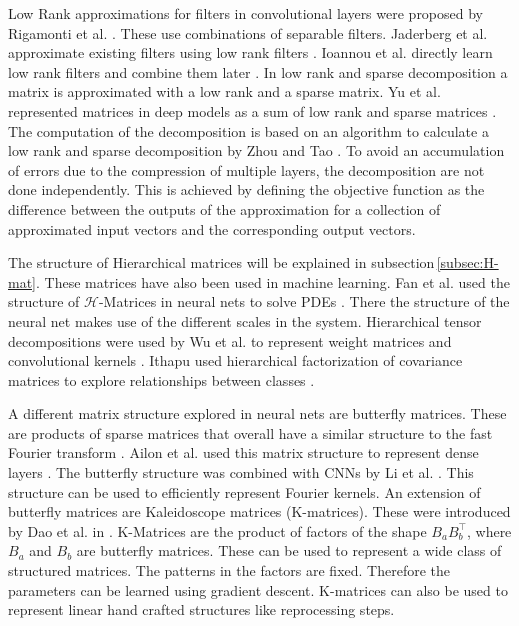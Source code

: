 \documentclass[doctype=mastersthesis,BCOR=15mm,biblatex]{ldvbook}%
\begin{document}
Low Rank approximations for filters in convolutional layers were proposed by Rigamonti et al. \cite{rigamonti_learning_2013}. These use combinations of separable filters. Jaderberg et al. approximate existing filters using low rank filters \cite{jaderberg_speeding_2014}. 
Ioannou et al. directly learn low rank filters and combine them later \cite{ioannou_training_2016}.
In low rank and sparse decomposition a matrix is approximated with a low rank and a sparse matrix. 
Yu et al. represented matrices in deep models as a sum of low rank and sparse matrices \cite{yu_compressing_2017}.
The computation of the decomposition is based on an algorithm to calculate a low rank and sparse decomposition by Zhou and Tao \cite{zhou_greedy_2013}.
To avoid an accumulation of errors due to the compression of multiple layers, the decomposition are not done independently.
This is achieved by defining the objective function as the difference between the outputs of the approximation for a collection of approximated input vectors and the corresponding output vectors.

The structure of Hierarchical matrices will be explained in subsection\,\ref{subsec:H-mat}. These matrices have also been used in machine learning. 
Fan et al. used the structure of $\mathcal{H}$-Matrices in neural nets to solve PDEs \cite{fan_multiscale_2019}. There the structure of the neural net makes use of the different scales in the system.
Hierarchical tensor decompositions were used by Wu et al. to represent weight matrices and convolutional kernels \cite{wu_hybrid_2020}.
Ithapu used hierarchical factorization of covariance matrices to explore relationships between classes \cite{ithapu_decoding_2017}.

A different matrix structure explored in neural nets are butterfly matrices.
These are products of sparse matrices that overall have a similar structure to the fast Fourier transform \cite{li_butterfly_2015,parker_random_1995}. Ailon et al. used this matrix structure to represent dense layers \cite{ailon_sparse_2021}.
The butterfly structure was combined with CNNs by Li et al. \cite{li_butterfly-net_2020}. This structure can be used to efficiently represent Fourier kernels.
An extension of butterfly matrices are Kaleidoscope matrices (K-matrices). These were introduced by Dao et al. in \cite{dao_kaleidoscope_2020}.
K-Matrices are the product of factors of the shape $B_aB_b^\top$, where $B_a$ and $B_b$ are butterfly matrices. These can be used to represent a wide class of structured matrices.
The patterns in the factors are fixed. Therefore the parameters can be learned using gradient descent.
K-matrices can also be used to represent linear hand crafted structures like reprocessing steps. %
\end{document}
